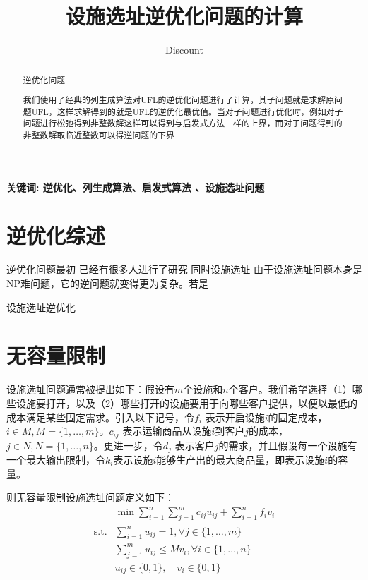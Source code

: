 \documentclass[UTF8]{article}
\author {Dis\cdot count}
\title {设施选址逆优化问题的计算}
\date{}
\begin{document}
    \maketitle

\begin{abstract}

逆优化问题

我们使用了经典的列生成算法对UFL的逆优化问题进行了计算，其子问题就是求解原问题UFL，这样求解得到的就是UFL的逆优化最优值。当对子问题进行优化时，例如对子问题进行松弛得到非整数解这样可以得到与启发式方法一样的上界，而对子问题得到的非整数解取临近整数可以得逆问题的下界


\end{abstract}

\qquad \textbf{关键词: 逆优化、列生成算法、启发式算法 、设施选址问题}

\section{逆优化综述}  %

逆优化问题最初
已经有很多人进行了研究
同时设施选址
由于设施选址问题本身是NP难问题，它的逆问题就变得更为复杂。若是

设施选址逆优化

\section{无容量限制}

设施选址问题通常被提出如下：假设有$m$个设施和$n$个客户。我们希望选择（1）哪些设施要打开，以及（2）哪些打开的设施要用于向哪些客户提供，以便以最低的成本满足某些固定需求。引入以下记号，令$f_i$ 表示开启设施$i$的固定成本，$i \in M, M=\{1,\ldots,m\}$。$c_{ij}$ 表示运输商品从设施$i$到客户$j$的成本，$j \in N, N=\{1,\ldots,n\}$。更进一步，令$d_j$ 表示客户$j$的需求，并且假设每一个设施有一个最大输出限制，令$k_i$表示设施$i$能够生产出的最大商品量，即表示设施$i$的容量。

则无容量限制设施选址问题定义如下：
\begin{align*}
&\min \sum_{i=1}^n \sum_{j=1}^m c_{ij}u_{ij} + \sum_{i=1}^n f_i v_i \\
\text{s.t.}& \sum_{i=1}^n u_{ij} =1, \forall j \in \{1,\ldots,m\}  \\
&\sum_{j=1}^m u_{ij}  \leq Mv_i, \forall i \in \{1,\ldots,n\} \\
& u_{ij} \in \{0,1\}, \quad v_{i} \in \{0,1\}
\end{align*}
\end{document}
